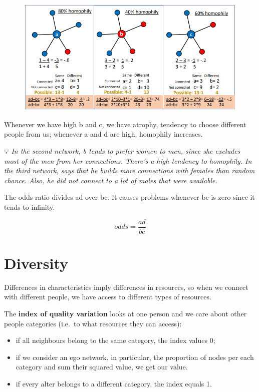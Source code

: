 \documentclass[
  notitlepage,
  onecolumn,
  openany]{book}
\providecommand{\tightlist}{%
  \setlength{\itemsep}{0pt}\setlength{\parskip}{0pt}}
\begin{document}
\begin{figure}[h!]

{\centering \includegraphics[width=0.8\linewidth]{images/06-Attributes based measures/Untitled 4} 

}

\end{figure}

Whenever we have high b and c, we have atrophy, tendency to choose different people from us; whenever a and d are high, homophily increases.

💡 \emph{In the second network, b tends to prefer women to men, since she excludes most of the men from her connections. There's a high tendency to homophily.
In the third network, says that he builds more connections with females than random chance. Also, he did not connect to a lot of males that were available.}

The odds ratio divides ad over bc. It causes problems whenever bc is zero since it tends to infinity.

\[
odds = \frac{ad}{bc}
\]

\hypertarget{diversity}{%
\section{Diversity}\label{diversity}}

Differences in characteristics imply differences in resources, so when we connect with different people, we have access to different types of resources.

The \textbf{index of quality variation} looks at one person and we care about other people categories (i.e.~to what resources they can access):

\begin{itemize}
\tightlist
\item
  if all neighbours belong to the same category, the index values 0;
\item
  if we consider an ego network, in particular, the proportion of nodes per each category and sum their squared value, we get our value.
\item
  if every alter belongs to a different category, the index equals 1.
\end{itemize}
\end{document}
